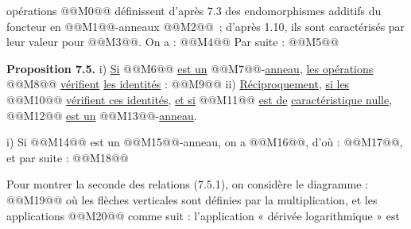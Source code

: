 
opérations @@M0@@
définissent d'après 7.3 des endomorphismes additifs du foncteur en @@M1@@-anneaux @@M2@@~; d'après 1.10, ils sont caractérisés par leur valeur pour @@M3@@. On a :
@@M4@@
Par suite :
@@M5@@

\textbf{Proposition 7.5.} i) \uline{Si} @@M6@@ \uline{est un} @@M7@@-\uline{anneau}, \uline{les opérations} @@M8@@ \uline{vérifient} \uline{les identités} :
@@M9@@
ii) \uline{Réciproquement}, \uline{si les} @@M10@@ \uline{vérifient ces identités}, \uline{et si} @@M11@@ \uline{est de} \uline{caractéristique nulle}, @@M12@@ \uline{est un} @@M13@@-\uline{anneau}.

i) Si @@M14@@ est un @@M15@@-anneau, on a @@M16@@, d'où : @@M17@@, et par suite :
@@M18@@

Pour montrer la seconde des relations (7.5.1), on considère le diagramme :
@@M19@@
où les flèches verticales sont définies par la multiplication, et les applications @@M20@@ comme suit : l'application « dérivée logarithmique » est
